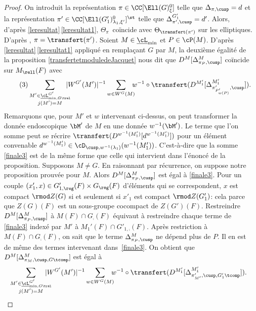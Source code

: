 \begin{proof}
On introduit la représentation $\pi\in \CC[\Ell(G)_{\xi}^0]$ telle que $\Delta_{\pi,\cusp}=d$ et la représentation $\pi'\in \CC[\Ell(G'_{1})^0_{\lambda_{1},\xi'}]^{\st}$ telle que $\Delta^{G'_{1}}_{\pi',\cusp}=d'$. Alors, d'après \ref{leresultat}\,\eqref{leresultat1}, $\Theta_{\pi}$~coïncide avec $\Theta_{\transfert(\pi')}$ sur les elliptiques. D'après \cite[Th.\,6.2]{A3}, $\pi=\transfert(\pi')$. Soient $M\in \underline{\cL}_{\min}$ et $P\in \cP(M)$. D'après \ref{leresultat}\,\eqref{leresultat1} appliqué en remplaçant $G$ par $M$, la deuxième égalité de la proposition \ref{transfertetmoduledeJacquet} nous dit que $D^M[\Delta^M_{\pi_{P},\cusp}]$ coïncide sur $M_{\rell}(F)$ avec
\begin{equation}\tag{3}\label{finale3}
\sum_{\substack{M'\in \underline{\cL}_{\min,G\trel}^{G'}\\ j(M')=M}}\hspace*{-3mm}\vert W^{G'}(M')\vert ^{-1}\sum_{w\in W^{G}(M)}\hspace*{-2mm}w^{-1}\circ \transfert( D^{M'_{1}}[\Delta^{M'_{1}}_{\pi'_{P'_{w(P)}},\cusp}]).
\end{equation}
Remarquons que, pour $M'$ et $w$ intervenant ci-dessus, on peut transformer la donnée endoscopique $\bM'$ de $M$ en une donnée $w^{-1}(\bM')$. Le terme que l'on somme peut se récrire $\transfert(D^{w^{-1}(M'_{1})}[d^{w^{-1}(M'_{1})}])$ pour un élément convenable $d^{w^{-1}(M'_{1})}\in \cD_{\cusp,w^{-1}(\lambda_{1})}(w^{-1}(M'_{1}))$. C'est-à-dire que la somme \eqref{finale3} est de la même forme que celle qui intervient dans l'énoncé de la proposition.
Supposons $M\neq G$. En raisonnant par récurrence, on suppose notre proposition prouvée pour $M$. Alors $D^M[\Delta^M_{\pi_{P},\cusp}]$ est égal à \eqref{finale3}. Pour un couple $(x'_{1},x)\in G'_{1,\reg}(F)\times G_{\reg}(F)$ d'éléments qui se correspondent, $x$ est compact $\rmod Z(G)$ si et seulement si $x'_{1}$ est compact $\rmod Z(G'_{1})$: cela parce
que $Z(G)(F)$ est un sous-groupe cocompact de $Z(G')(F)$. Restreindre $D^M[\Delta^M_{\pi_{P},\cusp}]$ à $M(F)\cap G_{\comp}(F)$ équivaut à restreindre chaque terme de \eqref{finale3} indexé par $M'$ à $M_{1}'(F)\cap G'_{1,\comp}(F)$. Après restriction à $M(F)\cap G_{\comp}(F)$, on sait que le terme $\Delta^M_{\pi_{P},\cusp}$ ne dépend plus de $P$. Il en est de même des termes intervenant dans~\eqref{finale3}. On obtient que $D^M[\Delta^M_{\pi_{M},\cusp,G\tcomp}]$ est égal à
\[
\sum_{\substack{M'\in \underline{\cL}_{\min,G\trel}^{G'}\\ j(M')=M}}\hspace*{-4mm}\vert W^{G'}(M')\vert ^{-1}\sum_{w\in W^{G}(M)} \hspace*{-2mm}w^{-1}\circ \transfert(D^{M'_{1}}[\Delta^{M'_{1}}_{\pi'_{M'},\cusp,G'_{1}\tcomp}]).
\]
\end{proof}
